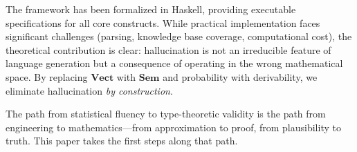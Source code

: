 \documentclass[11pt,a4paper]{article}
\theoremstyle{plain}
\theoremstyle{definition}
\theoremstyle{remark}
\newcommand{\Sem}{\mathbf{Sem}}
\newcommand{\Vect}{\mathbf{Vect}}
\begin{document}
The framework has been formalized in Haskell, providing executable specifications for all core constructs.
While practical implementation faces significant challenges (parsing, knowledge base coverage, computational cost), the theoretical contribution is clear: hallucination is not an irreducible feature of language generation but a consequence of operating in the wrong mathematical space.
By replacing $\Vect$ with $\Sem$ and probability with derivability, we eliminate hallucination \emph{by construction}.

The path from statistical fluency to type-theoretic validity is the path from engineering to mathematics---from approximation to proof, from plausibility to truth.
This paper takes the first steps along that path.


\end{document}
